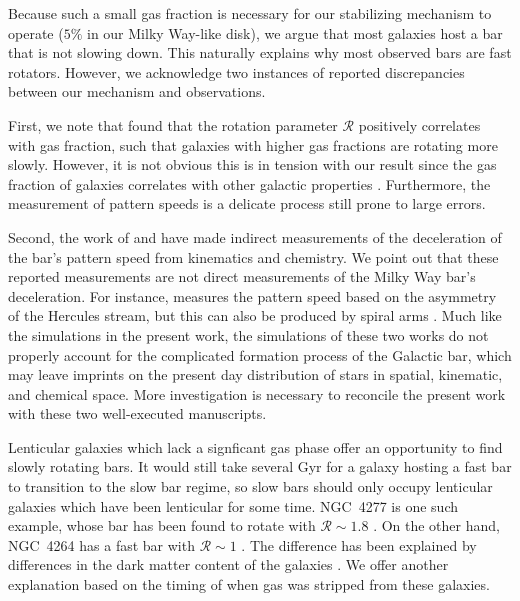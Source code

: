 \documentclass[twocolumn,linenumbers,trackchanges]{aastex631}
\newcommand{\Rot}{\ensuremath{\mathcal{R}}}
\begin{document}
Because such a small gas fraction is necessary for our stabilizing mechanism to
operate ($5\%$ in our Milky Way-like disk), we argue that most galaxies host a
bar that is not slowing down. This naturally explains why most observed bars are
fast rotators. However, we acknowledge two instances of reported discrepancies
between our mechanism and observations.

First, we note that \citet{2020MNRAS.491.3655G} found that the rotation
parameter \Rot{} positively correlates with gas fraction, such that galaxies
with higher gas fractions are rotating more slowly. However, it is not obvious
this is in tension with our result since the gas fraction of galaxies correlates
with other galactic properties \citep{2009ARAA..47..159B}. Furthermore, the
measurement of pattern speeds is a delicate process still prone to large errors.

Second, the work of \citet{2021MNRAS.500.4710C} and \citet{2021MNRAS.505.2412C}
have made indirect measurements of the deceleration of the bar's pattern speed
from kinematics and chemistry. We point out that these reported measurements are
not direct measurements of the Milky Way bar's deceleration. For instance,
\citet{2021MNRAS.500.4710C} measures the pattern speed based on the asymmetry of
the Hercules stream, but this can also be produced by spiral arms
\citep{2018MNRAS.481.3794H}. Much like the simulations in the present work, the
simulations of these two works do not properly account for the complicated
formation process of the Galactic bar, which may leave imprints on the present
day distribution of stars in spatial, kinematic, and chemical space. More
investigation is necessary to reconcile the present work with these two
well-executed manuscripts.

Lenticular galaxies which lack a signficant gas phase offer an opportunity
to find slowly rotating bars. It would still take several Gyr for a galaxy
hosting a fast bar to transition to the slow bar regime, so slow bars should
only occupy lenticular galaxies which have been lenticular for some time.
NGC~4277 is one such example, whose bar has been found to rotate with
$\Rot{}\sim1.8$ \citep{2022AA...664L..10B}. On the other hand, NGC~4264 has a
fast bar with $\Rot{}\sim1$ \citep{2019MNRAS.488.4972C}. The difference has been
explained by differences in the dark matter content of the galaxies
\citep{2023MNRAS.521.2227B}. We offer another explanation based on the timing of
when gas was stripped from these galaxies.
\end{document}
